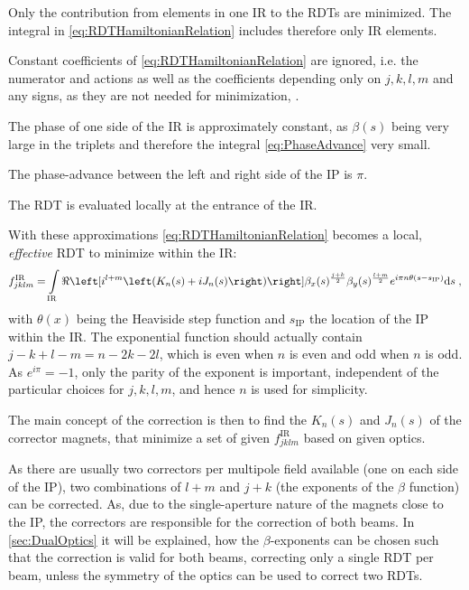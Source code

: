 \begin{mytemize}
    \item Only the contribution from elements in one IR to the RDTs are minimized.
          The integral in \cref{eq:RDTHamiltonianRelation} includes therefore only IR elements.
    \item Constant coefficients of \cref{eq:RDTHamiltonianRelation} are ignored, 
          i.e. the numerator and actions as well as the coefficients depending only on $j,k,l,m$ and any signs,
          as they are not needed for minimization, .
    \item The phase of one side of the IR is approximately constant, as $\beta(s)$ being very large in the triplets
          and therefore the integral \cref{eq:PhaseAdvance} very small. 
    \item The phase-advance between the left and right side of the IP is $\pi$. 
    \item The RDT is evaluated locally at the entrance of the IR. 
\end{mytemize}

With these approximations \cref{eq:RDTHamiltonianRelation} 
becomes a local, \textit{effective} RDT to minimize within the IR:
%
\begin{equation}
    \label{eq:effectiveRDT}
    f^\text{IR}_{jklm} =  \int\limits_\text{IR} 
    \ReOf{    
     i^{l+m}
     \left(K_{n}(s) + iJ_{n}(s) \right) 
    }
        \beta_x(s)^{\frac{j+k}{2}}
        \beta_y(s)^{\frac{l+m}{2}} 
     e^{i \pi n \theta(s - s_\text{IP})}
    \mathrm{d}s \; ,
\end{equation}
%
with $\theta(x)$ being the Heaviside step function and $s_\text{IP}$ the location of 
the IP within the IR.
The exponential function should actually contain $j - k + l - m = n - 2k - 2l$, 
which is even when $n$ is even and odd when $n$ is odd. 
As $e^{i\pi} = -1$, only the parity of the exponent is important, 
independent of the particular choices for $j,k,l,m$,
and hence $n$ is used for simplicity.

The main concept of the correction is then to find the $K_n(s)$ and $J_n(s)$ of 
the corrector magnets, that minimize a set of given $f^\text{IR}_{jklm}$ based on given optics.

As there are usually two correctors per multipole field available (one on each side of the IP), 
two combinations of $l+m$ and $j+k$ (the exponents of the $\beta$ function)
can be corrected.
As, due to the single-aperture nature of the magnets close to the IP,
the correctors are responsible for the correction of both beams.
In \cref{sec:DualOptics} it will be explained, how
the $\beta$-exponents can be chosen such that the correction is valid for both beams, 
correcting only a single RDT per beam,
unless the symmetry of the optics can be used to correct two RDTs. 

